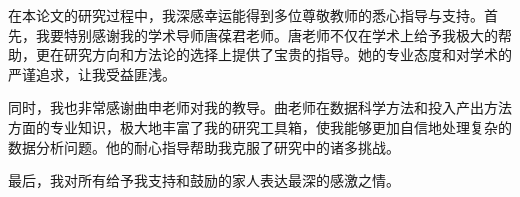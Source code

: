 %
%
%
%
%
%

\begin{acknowledgements}
  在本论文的研究过程中，我深感幸运能得到多位尊敬教师的悉心指导与支持。首先，我要特别感谢我的学术导师唐葆君老师。唐老师不仅在学术上给予我极大的帮助，更在研究方向和方法论的选择上提供了宝贵的指导。她的专业态度和对学术的严谨追求，让我受益匪浅。

  同时，我也非常感谢曲申老师对我的教导。曲老师在数据科学方法和投入产出方法方面的专业知识，极大地丰富了我的研究工具箱，使我能够更加自信地处理复杂的数据分析问题。他的耐心指导帮助我克服了研究中的诸多挑战。

  最后，我对所有给予我支持和鼓励的家人表达最深的感激之情。

\end{acknowledgements}
